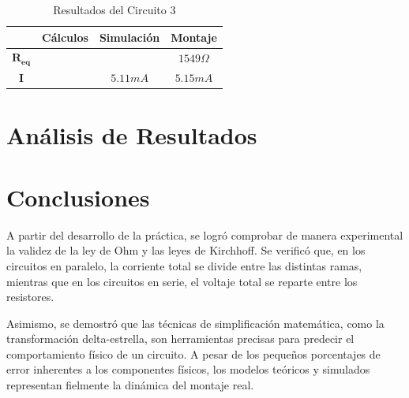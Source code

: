 \documentclass[journal]{IEEEtran}
\begin{document}
\begin{table}[htbp]

\centering
\caption{Resultados del Circuito 3}
    
        \begin{tabular}{|c|c|c|c|}
            
            \hline
            & \textbf{Cálculos} & \textbf{Simulación} & \textbf{Montaje} \\
            \hline
            $\mathbf{R_{eq}}$ &  &  & $1549\varOmega$\\
            \hline
            $\mathbf{I}$ &  & $5.11mA$ & $5.15mA$\\
            \hline

    \end{tabular}

\end{table}

\section{Análisis de Resultados}

\section{Conclusiones}
A partir del desarrollo de la práctica, se logró comprobar de manera experimental la validez de la ley de Ohm y las leyes de Kirchhoff. 
Se verificó que, en los circuitos en paralelo, la corriente total se divide entre las distintas ramas, mientras que en los circuitos en serie, el 
voltaje total se reparte entre los resistores. 

Asimismo, se demostró que las técnicas de simplificación matemática, como la transformación delta-estrella, son herramientas precisas para predecir el comportamiento físico de un circuito. A pesar de los pequeños porcentajes de error inherentes a los componentes físicos, los modelos teóricos y simulados representan fielmente la dinámica del montaje real.
\end{document}
